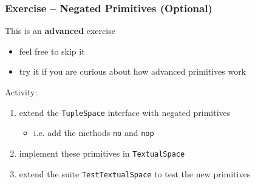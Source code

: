 \documentclass[presentation]{beamer}\mode<presentation>{\usetheme{AMSCesenaPurpleAndGold}}
\begin{document}
\begin{frame}[allowframebreaks]
	\frametitle{Exercise \currentExercise{} -- Negated Primitives (Optional)}
	
	\begin{alertblock}{This is an \textbf{advanced} exercise}
		\begin{itemize}
			\item feel free to skip it
			\item try it if you are curious about how advanced primitives work
		\end{itemize}
	\end{alertblock}
	
	\bigskip
	
	Activity:
	\medskip
	\begin{enumerate}
		\item extend the \texttt{TupleSpace} interface with \alert{negated} primitives
		\begin{itemize}
			\item i.e. add the methods \texttt{no} and \texttt{nop}
		\end{itemize}
		
		\medskip
		
		\item implement these primitives in \texttt{TextualSpace}
		
		\medskip
		
		\item extend the suite \texttt{TestTextualSpace} to test the new primitives
		
	\end{enumerate}
	
\end{frame}

\section*{}

\frame{\titlepage}
\end{document}
